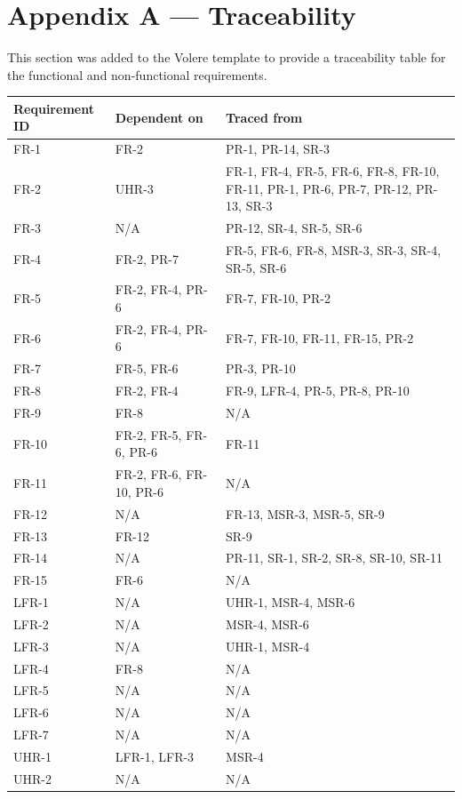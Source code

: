 \documentclass[12pt]{article}
\begin{document}
\section*{Appendix A --- Traceability}
This section was added to the Volere template to provide a traceability table for the functional and non-functional requirements.
\begin{longtable}[c]{| m{3.4cm} | m{4cm} | m{5.3cm} |}
  \hline
  \textbf{Requirement ID} & \textbf{Dependent on} & \textbf{Traced from} \\ \hline
  \endhead
  FR-1 & FR-2 & PR-1, PR-14, SR-3 \\ \hline
  FR-2 & UHR-3 & FR-1, FR-4, FR-5, FR-6, FR-8, FR-10, FR-11, PR-1, PR-6, PR-7, PR-12, PR-13, SR-3 \\ \hline
  FR-3 & N/A & PR-12, SR-4, SR-5, SR-6 \\ \hline
  FR-4 & FR-2, PR-7 & FR-5, FR-6, FR-8, MSR-3, SR-3, SR-4, SR-5, SR-6 \\ \hline
  FR-5 & FR-2, FR-4, PR-6 & FR-7, FR-10, PR-2 \\ \hline
  FR-6 & FR-2, FR-4, PR-6 & FR-7, FR-10, FR-11, FR-15, PR-2 \\ \hline
  FR-7 & FR-5, FR-6 & PR-3, PR-10 \\ \hline
  FR-8 & FR-2, FR-4 & FR-9, LFR-4, PR-5, PR-8, PR-10 \\ \hline
  FR-9 & FR-8 & N/A \\ \hline
  FR-10 & FR-2, FR-5, FR-6, PR-6 & FR-11 \\ \hline
  FR-11 & FR-2, FR-6, FR-10, PR-6 & N/A \\ \hline
  FR-12 & N/A & FR-13, MSR-3, MSR-5, SR-9 \\ \hline
  FR-13 & FR-12 & SR-9 \\ \hline
  FR-14 & N/A & PR-11, SR-1, SR-2, SR-8, SR-10, SR-11 \\ \hline
  FR-15 & FR-6 & N/A \\ \hline
  LFR-1 & N/A & UHR-1, MSR-4, MSR-6 \\ \hline
  LFR-2 & N/A & MSR-4, MSR-6 \\ \hline
  LFR-3 & N/A & UHR-1, MSR-4 \\ \hline
  LFR-4 & FR-8 & N/A \\ \hline
  LFR-5 & N/A & N/A \\ \hline
  LFR-6 & N/A & N/A \\ \hline
  LFR-7 & N/A & N/A \\ \hline
  UHR-1 & LFR-1, LFR-3 & MSR-4 \\ \hline
  UHR-2 & N/A & N/A \\ \hline

\end{longtable}
\end{document}
